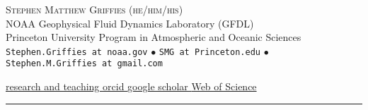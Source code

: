 \documentclass{article}
\newcommand{\shadebox}[3][.9]{\fcolorbox[gray]{0}{#1}{\parbox{#2}{#3}}}
\begin{document}
\thispagestyle{empty}


\begin{center}

\sc 




\textsc{\large \color{Maroon} \protect Stephen Matthew Grif\/f\/ies (he/him/his)}
\\[1ex]

NOAA Geophysical Fluid Dynamics Laboratory (GFDL)
\\
Princeton University Program in Atmospheric and Oceanic Sciences 
\\
{\tt \small Stephen.Griffies at noaa.gov} $\bullet$
{\tt \small  SMG at Princeton.edu} 
$\bullet$ {\tt  \small Stephen.M.Griffies at gmail.com} 
\\  
\vspace{0.1cm}

\href{https://StephenGriffies.github.io/}{research and teaching \hspace{0.5cm}}
\href{https://orcid.org/0000-0002-3711-236X}{orcid \hspace{0.5cm}}
\href{https://scholar.google.com/citations?user=4LPPPBAAAAAJ&hl=en}{google scholar \hspace{0.5cm}}
\href{https://www.webofscience.com/wos/author/record/55160}{Web of Science}
\noindent\rule{\textwidth}{1pt}



\end{center}


\vspace{-1cm}
\end{document}
